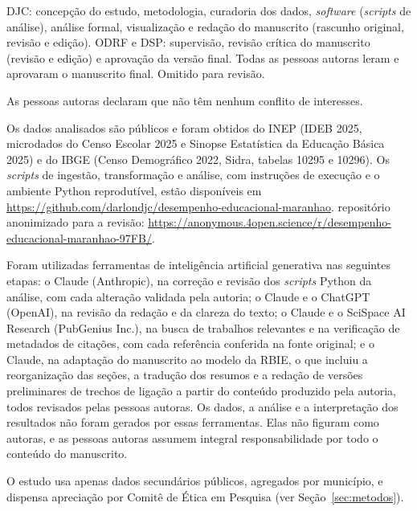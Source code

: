 \begin{declarations}

\begin{contributions}
\ifidentificado
DJC: concepção do estudo, metodologia, curadoria dos dados, \textit{software} (\textit{scripts} de análise), análise formal, visualização e redação do manuscrito (rascunho original, revisão e edição). ODRF e DSP: supervisão, revisão crítica do manuscrito (revisão e edição) e aprovação da versão final. Todas as pessoas autoras leram e aprovaram o manuscrito final.
\else
Omitido para revisão.
\fi
\end{contributions}

\begin{interests}
As pessoas autoras declaram que não têm nenhum conflito de interesses.
\end{interests}

\begin{materials}
Os dados analisados são públicos e foram obtidos do INEP (IDEB 2025, microdados do Censo Escolar 2025 e Sinopse Estatística da Educação Básica 2025) e do IBGE (Censo Demográfico 2022, Sidra, tabelas 10295 e 10296). Os \textit{scripts} de ingestão, transformação e análise, com instruções de execução e o ambiente Python reprodutível, estão disponíveis em
\ifidentificado
\url{https://github.com/darlondjc/desempenho-educacional-maranhao}.
\else
repositório anonimizado para a revisão: \url{https://anonymous.4open.science/r/desempenho-educacional-maranhao-97FB/}.
\fi
\end{materials}

\begin{aiusagedeclaration}
Foram utilizadas ferramentas de inteligência artificial generativa nas seguintes etapas: o Claude (Anthropic), na correção e revisão dos \textit{scripts} Python da análise, com cada alteração validada pela autoria; o Claude e o ChatGPT (OpenAI), na revisão da redação e da clareza do texto; o Claude e o SciSpace AI Research (PubGenius Inc.), na busca de trabalhos relevantes e na verificação de metadados de citações, com cada referência conferida na fonte original; e o Claude, na adaptação do manuscrito ao modelo da RBIE, o que incluiu a reorganização das seções, a tradução dos resumos e a redação de versões preliminares de trechos de ligação a partir do conteúdo produzido pela autoria, todos revisados pelas pessoas autoras. Os dados, a análise e a interpretação dos resultados não foram gerados por essas ferramentas. Elas não figuram como autoras, e as pessoas autoras assumem integral responsabilidade por todo o conteúdo do manuscrito.
\end{aiusagedeclaration}

\begin{furtherinformation}
O estudo usa apenas dados secundários públicos, agregados por município, e dispensa apreciação por Comitê de Ética em Pesquisa (ver Seção~\ref{sec:metodos}).
\end{furtherinformation}

\end{declarations}
